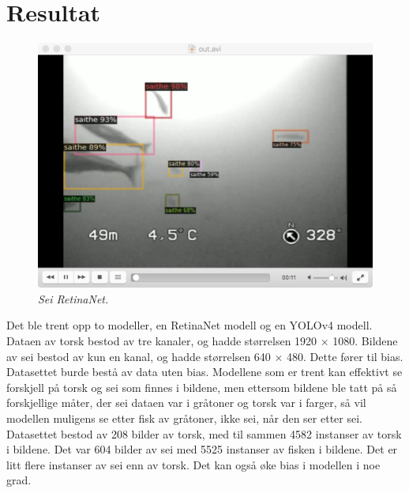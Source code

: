 

\section{Resultat}

\begin{figure}[h!]
\begin{center} 
\includegraphics[scale=0.35]{figures/retinanet_inference_saithe}
\caption{\small \sl Sei RetinaNet. \label{fig:retinanet_inference_saithe}}
\end{center}
\end{figure}

Det ble trent opp to modeller, en RetinaNet modell og en YOLOv4 modell. Dataen av torsk bestod av tre kanaler, og hadde størrelsen 1920 $\times$ 1080. Bildene av sei bestod av kun en kanal, og hadde størrelsen 640 $\times$ 480. Dette fører til bias. Datasettet burde bestå av data uten bias. Modellene som er trent kan effektivt se forskjell på torsk og sei som finnes i bildene, men ettersom bildene ble tatt på så forskjellige måter, der sei dataen var i gråtoner og torsk var i farger, så vil modellen muligens se etter fisk av gråtoner, ikke sei, når den ser etter sei. Datasettet bestod av 208 bilder av torsk, med til sammen 4582 instanser av torsk i bildene. Det var 604 bilder av sei med 5525 instanser av fisken i bildene. Det er litt flere instanser av sei enn av torsk. Det kan også øke bias i modellen i noe grad.

